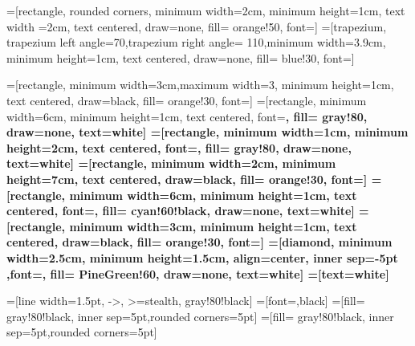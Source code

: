 
=[rectangle, rounded corners, minimum width=2cm,  minimum height=1cm, text width =2cm, text centered, draw=none, fill= orange!50, font=\sf]
=[trapezium, trapezium left angle=70,trapezium right angle= 110,minimum width=3.9cm, minimum height=1cm, text centered, draw=none, fill= blue!30, font=\sf]

=[rectangle, minimum width=3cm,maximum width=3, minimum height=1cm, text centered, draw=black, fill= orange!30, font=\sffamily]
=[rectangle, minimum width=6cm, minimum height=1cm, text centered, font=\sf\bfseries,  fill= gray!80, draw=none, text=white]
=[rectangle, minimum width=1cm, minimum height=2cm, text centered, font=\sf\bfseries,  fill= gray!80, draw=none, text=white]
=[rectangle, minimum width=2cm, minimum height=7cm, text centered, draw=black, fill= orange!30, font=\sffamily]
=[rectangle, minimum width=6cm, minimum height=1cm, text centered,  font=\sf\bfseries,  fill= cyan!60!black, draw=none, text=white]
=[rectangle, minimum width=3cm, minimum height=1cm, text centered, draw=black, fill= orange!30, font=\sffamily]
=[diamond, minimum width=2.5cm, minimum height=1.5cm, align=center, inner sep=-5pt ,font=\sf\bfseries,  fill= PineGreen!60, draw=none, text=white]
=[text=white]

=[line width=1.5pt, ->, >=stealth, gray!80!black]
=[font=\sf{},black]
=[fill= gray!80!black, inner sep=5pt,rounded corners=5pt]
=[fill= gray!80!black, inner sep=5pt,rounded corners=5pt]


\newcommand{\tikzcircle}[2][red,fill=red]{\tikz[baseline=-0.5ex]\draw[#1,radius=#2] (0,0) circle ;}%
\newcommand\Heatset[1]{\pgfkeys{/heat, #1}}
\newcommand\HVal[1]{\pgfkeysvalueof{/heat/#1}}

